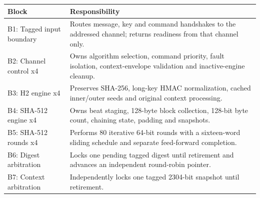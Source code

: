 \documentclass[11pt,a4paper]{article}
\begin{document}
{\small\renewcommand{\arraystretch}{1.18}\begin{longtable}{@{}L{0.24\textwidth}|L{0.7\textwidth}@{}}\toprule

\textbf{Block} & \textbf{Responsibility}\\\midrule\endhead

B1: Tagged input boundary & Routes message,\allowbreak{} key and command handshakes to the addressed channel; returns readiness from that channel only.\\[2pt]\hline

B2: Channel control x4 & Owns algorithm selection,\allowbreak{} command priority,\allowbreak{} fault isolation,\allowbreak{} context-envelope validation and inactive-engine cleanup.\\[2pt]\hline

B3: H2 engine x4 & Preserves SHA-256,\allowbreak{} long-key HMAC normalization,\allowbreak{} cached inner/\allowbreak{}outer seeds and original context processing.\\[2pt]\hline

B4: SHA-512 engine x4 & Owns beat staging,\allowbreak{} 128-byte block collection,\allowbreak{} 128-bit byte count,\allowbreak{} chaining state,\allowbreak{} padding and snapshots.\\[2pt]\hline

B5: SHA-512 rounds x4 & Performs 80 iterative 64-bit rounds with a sixteen-word sliding schedule and separate feed-forward completion.\\[2pt]\hline

B6: Digest arbitration & Locks one pending tagged digest until retirement and advances an independent round-robin pointer.\\[2pt]\hline

B7: Context arbitration & Independently locks one tagged 2304-bit snapshot until retirement.\\[2pt]\hline

\bottomrule\end{longtable}}
\end{document}
